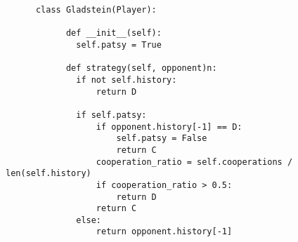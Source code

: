 \begin{frame}[fragile]
    \begin{verbatim}
      class Gladstein(Player):

            def __init__(self):
              self.patsy = True

            def strategy(self, opponent)n:
              if not self.history:
                  return D

              if self.patsy:
                  if opponent.history[-1] == D:
                      self.patsy = False
                      return C
                  cooperation_ratio = self.cooperations / len(self.history)
                  if cooperation_ratio > 0.5:
                      return D
                  return C
              else:
                  return opponent.history[-1]
    \end{verbatim}
\end{frame}
